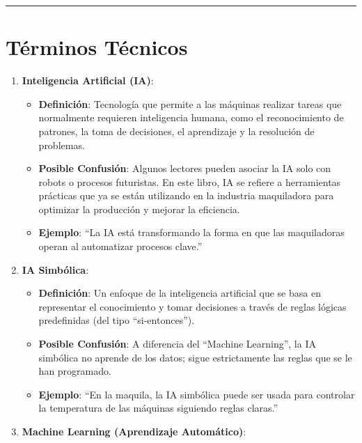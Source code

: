 \documentclass[
  10pt,
  letterpaper,
]{book}
\providecommand{\tightlist}{%
  \setlength{\itemsep}{0pt}\setlength{\parskip}{0pt}}\usepackage{longtable,booktabs,array}
\begin{document}
\begin{center}\rule{0.5\linewidth}{0.5pt}\end{center}

\section{\texorpdfstring{\textbf{Términos
Técnicos}}{Términos Técnicos}}\label{tuxe9rminos-tuxe9cnicos}

\begin{enumerate}
\def\labelenumi{\arabic{enumi}.}
\tightlist
\item
  \textbf{Inteligencia Artificial (IA)}:

  \begin{itemize}
  \tightlist
  \item
    \textbf{Definición}: Tecnología que permite a las máquinas realizar
    tareas que normalmente requieren inteligencia humana, como el
    reconocimiento de patrones, la toma de decisiones, el aprendizaje y
    la resolución de problemas.
  \item
    \textbf{Posible Confusión}: Algunos lectores pueden asociar la IA
    solo con robots o procesos futuristas. En este libro, IA se refiere
    a herramientas prácticas que ya se están utilizando en la industria
    maquiladora para optimizar la producción y mejorar la eficiencia.
  \item
    \textbf{Ejemplo}: ``La IA está transformando la forma en que las
    maquiladoras operan al automatizar procesos clave.''
  \end{itemize}
\item
  \textbf{IA Simbólica}:

  \begin{itemize}
  \tightlist
  \item
    \textbf{Definición}: Un enfoque de la inteligencia artificial que se
    basa en representar el conocimiento y tomar decisiones a través de
    reglas lógicas predefinidas (del tipo ``si-entonces'').
  \item
    \textbf{Posible Confusión}: A diferencia del ``Machine Learning'',
    la IA simbólica no aprende de los datos; sigue estrictamente las
    reglas que se le han programado.
  \item
    \textbf{Ejemplo}: ``En la maquila, la IA simbólica puede ser usada
    para controlar la temperatura de las máquinas siguiendo reglas
    claras.''
  \end{itemize}
\item
  \textbf{Machine Learning (Aprendizaje Automático)}:


\end{enumerate}
\end{document}

